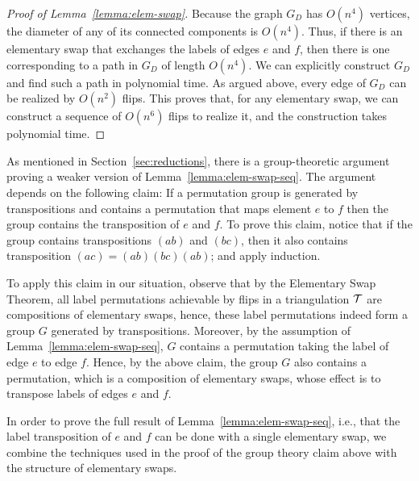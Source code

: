 \begin{proof}[Proof of Lemma~\ref{lemma:elem-swap}]
Because the graph $G_D$ has $O(n^4)$ vertices, the diameter of any of its connected components is $O(n^4)$.
Thus, if there is an elementary swap that exchanges the labels of edges $e$ and $f$, then there is one corresponding to a path in $G_D$ of length $O(n^4)$.
We can explicitly construct $G_D$ and find such a path in polynomial time.
As argued above, every edge of $G_D$ can be realized by $O(n^2)$ flips.
This proves that, for any elementary swap, we can construct a sequence of $O(n^6)$ flips to realize it, and the construction takes polynomial time.  
\end{proof}  



As  
mentioned in Section~\ref{sec:reductions}, there is a group-theoretic argument proving a weaker version of Lemma~\ref{lemma:elem-swap-seq}.  The argument depends on the following claim: If a permutation group is generated by transpositions and contains a permutation that maps element $e$ to $f$ then the group contains the transposition of $e$ and $f$. To prove this claim, notice that if the group contains transpositions $(ab)$ and $(bc)$, then it also contains transposition $(ac)=(ab)(bc)(ab)$; and apply induction.   


To apply this claim in our situation, observe that
by the Elementary Swap Theorem, all label permutations achievable by flips in a triangulation $\cal T$ are compositions of elementary swaps, hence, these label permutations indeed form a group $G$ generated by transpositions. Moreover, by the assumption of Lemma~\ref{lemma:elem-swap-seq}, $G$ contains a permutation taking the label of edge $e$ to edge $f$. Hence, by the above claim, the group $G$ also contains a 
permutation, which is a composition of elementary swaps, whose effect is to transpose labels of edges $e$ and $f$.

In order to prove the full result of Lemma~\ref{lemma:elem-swap-seq}, i.e., that the label transposition of $e$ and $f$ can be done with a single elementary swap, we combine the techniques used in the proof of the group theory claim above with the structure of elementary swaps. 

